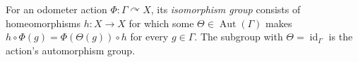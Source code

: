 
For an odometer action $\Phi:\Gamma\curvearrowright X$, its \emph{isomorphism group} consists of homeomorphisms $h:X\to X$ for which some $\Theta\in\operatorname{Aut}(\Gamma)$ makes $h\circ\Phi(g)=\Phi(\Theta(g))\circ h$ for every $g\in\Gamma$. The subgroup with $\Theta=\operatorname{id}_{\Gamma}$ is the action's automorphism group.
